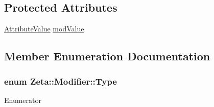 \subsection*{Protected Attributes}
\begin{DoxyCompactItemize}
\item 
\hyperlink{namespaceZeta_ab5947f98c0ab6302b51f8c6e93ec5581}{Attribute\+Value} \hyperlink{classZeta_1_1Modifier_ae9685e22722b0aaae9edd1a074a6251d}{mod\+Value}
\end{DoxyCompactItemize}


\subsection{Member Enumeration Documentation}
\hypertarget{classZeta_1_1Modifier_a0081811b87d3bc0fc672b9773951d0b7}{
\subsubsection[{Type}]{\setlength{\rightskip}{0pt plus 5cm}enum {\bf Zeta\+::\+Modifier\+::\+Type}\hspace{0.3cm}{\ttfamily [strong]}}}\label{classZeta_1_1Modifier_a0081811b87d3bc0fc672b9773951d0b7}
\begin{Desc}
\item[Enumerator]\par
\begin{description}
\item[{\em 
\hypertarget{classZeta_1_1Modifier_a0081811b87d3bc0fc672b9773951d0b7a745e3db6a7ffd50e1a72b39482f0882d}{Flat}\label{classZeta_1_1Modifier_a0081811b87d3bc0fc672b9773951d0b7a745e3db6a7ffd50e1a72b39482f0882d}
}]\item[{\em 
\hypertarget{classZeta_1_1Modifier_a0081811b87d3bc0fc672b9773951d0b7af60357a8d17e45793298323f1b372a74}{Scalar}\label{classZeta_1_1Modifier_a0081811b87d3bc0fc672b9773951d0b7af60357a8d17e45793298323f1b372a74}
}]\end{description}
\end{Desc}


